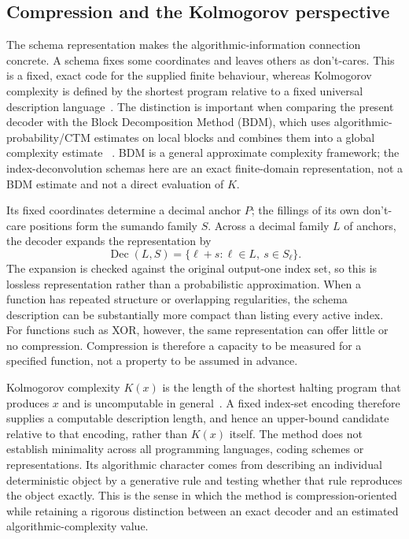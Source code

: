 \documentclass[11pt,a4paper]{article}
\begin{document}
\subsection{Compression and the Kolmogorov perspective}

The schema representation makes the algorithmic-information connection
concrete. A schema fixes some coordinates and leaves others as don't-cares.
This is a fixed, exact code for the supplied finite behaviour, whereas
Kolmogorov complexity is defined by the shortest program relative to a fixed
universal description language~\cite{kolmogorov1965,chaitin1966,li2019}.
The distinction is important when comparing the present decoder with the
Block Decomposition Method (BDM), which uses algorithmic-probability/CTM
estimates on local blocks and combines them into a global complexity estimate
~\cite{zenil2018bdm}. BDM is a general approximate complexity framework; the
index-deconvolution schemas here are an exact finite-domain representation,
not a BDM estimate and not a direct evaluation of $K$.

Its fixed coordinates determine a decimal anchor $P$; the fillings of its
own don't-care positions form the sumando family $S$. Across a decimal family
$L$ of anchors, the decoder expands the representation by
\begin{equation}
  \operatorname{Dec}(L,S)=\{\ell+s:\ell\in L,\ s\in S_{\ell}\}.
\end{equation}
The expansion is checked against the original output-one index set, so this
is lossless representation rather than a probabilistic approximation. When a
function has repeated structure or overlapping regularities, the schema
description can be substantially more compact than listing every active
index. For functions such as XOR, however, the same representation can offer
little or no compression. Compression is therefore a capacity to be measured
for a specified function, not a property to be assumed in advance.

Kolmogorov complexity $K(x)$ is the length of the shortest halting program
that produces $x$ and is uncomputable in general~\cite{kolmogorov1965,
chaitin1966,li2019}. A fixed index-set encoding therefore supplies a
computable description length, and hence an upper-bound candidate relative to
that encoding, rather than $K(x)$ itself. The method does not establish
minimality across all programming languages, coding schemes or 
representations. Its algorithmic character comes from describing an
individual deterministic object by a generative rule and testing whether
that rule reproduces the object exactly. This is the sense in which the
method is compression-oriented while retaining a rigorous distinction between
an exact decoder and an estimated algorithmic-complexity value.
\end{document}

